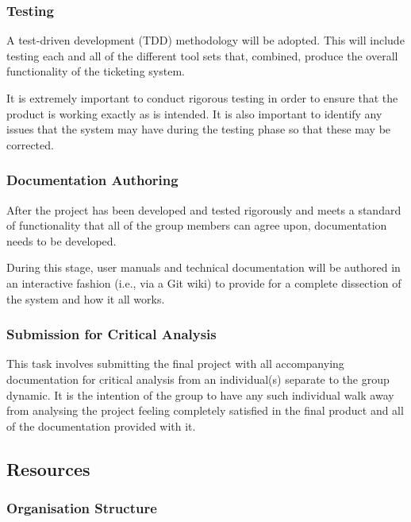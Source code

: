 \documentclass[12pt,a4paper,]{article}
\begin{document}
\subsubsection{Testing}\label{testing}

A test-driven development (TDD) methodology will be adopted. This will
include testing each and all of the different tool sets that, combined,
produce the overall functionality of the ticketing system.

It is extremely important to conduct rigorous testing in order to ensure
that the product is working exactly as is intended. It is also important
to identify any issues that the system may have during the testing phase
so that these may be corrected.

\subsubsection{Documentation Authoring}\label{documentation-authoring}

After the project has been developed and tested rigorously and meets a
standard of functionality that all of the group members can agree upon,
documentation needs to be developed.

During this stage, user manuals and technical documentation will be
authored in an interactive fashion (i.e., via a Git wiki) to provide for
a complete dissection of the system and how it all works.

\subsubsection{Submission for Critical
Analysis}\label{submission-for-critical-analysis}

This task involves submitting the final project with all accompanying
documentation for critical analysis from an individual(s) separate to
the group dynamic. It is the intention of the group to have any such
individual walk away from analysing the project feeling completely
satisfied in the final product and all of the documentation provided
with it.

\subsection{Resources}\label{resources}

\subsubsection{Organisation Structure}\label{organisation-structure}
\end{document}
